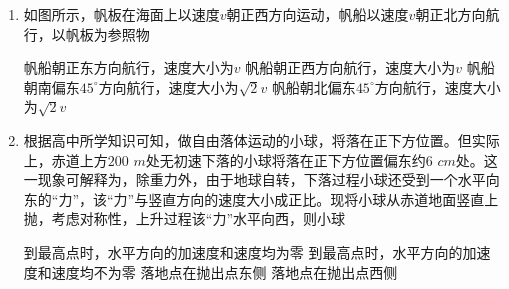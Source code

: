 \begin{enumerate}[leftmargin=0em]
\item 
{}
如图所示，帆板在海面上以速度$ v $朝正西方向运动，帆船以速度$ v $朝正北方向航行，以帆板为参照物  
\begin{figure}[h!]
\centering

\end{figure}

\fourchoices
{帆船朝正东方向航行，速度大小为$ v $}
{帆船朝正西方向航行，速度大小为$ v $}
{帆船朝南偏东$ 45 ^{ \circ } $方向航行，速度大小为$ \sqrt{2}v $}
{帆船朝北偏东$ 45 ^{ \circ } $方向航行，速度大小为$ \sqrt{2}v $}


\item 
{}
根据高中所学知识可知，做自由落体运动的小球，将落在正下方位置。但实际上，赤道上方$ 200 $ $ m $处无初速下落的小球将落在正下方位置偏东约$ 6 $ $ cm $处。这一现象可解释为，除重力外，由于地球自转，下落过程小球还受到一个水平向东的“力”，该“力”与竖直方向的速度大小成正比。现将小球从赤道地面竖直上抛，考虑对称性，上升过程该“力”水平向西，则小球  

\fourchoices
{到最高点时，水平方向的加速度和速度均为零}
{到最高点时，水平方向的加速度和速度均不为零}
{落地点在抛出点东侧}
{落地点在抛出点西侧}







\end{enumerate}


